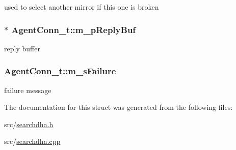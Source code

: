 used to select another mirror if this one is broken 

\hypertarget{structAgentConn__t_add128e00687669a2b318381ec7e6be04}{
\subsubsection[{m\-\_\-p\-Reply\-Buf}]{$\ast$ Agent\-Conn\-\_\-t\-::m\-\_\-p\-Reply\-Buf}}\label{structAgentConn__t_add128e00687669a2b318381ec7e6be04}


reply buffer 

\hypertarget{structAgentConn__t_a90c41f9dede2f2db77525cc0f3668042}{
\subsubsection[{m\-\_\-s\-Failure}]{ Agent\-Conn\-\_\-t\-::m\-\_\-s\-Failure}}\label{structAgentConn__t_a90c41f9dede2f2db77525cc0f3668042}


failure message 



The documentation for this struct was generated from the following files\-:\begin{DoxyCompactItemize}
\item 
src/\hyperlink{searchdha_8h}{searchdha.\-h}\item 
src/\hyperlink{searchdha_8cpp}{searchdha.\-cpp}\end{DoxyCompactItemize}
